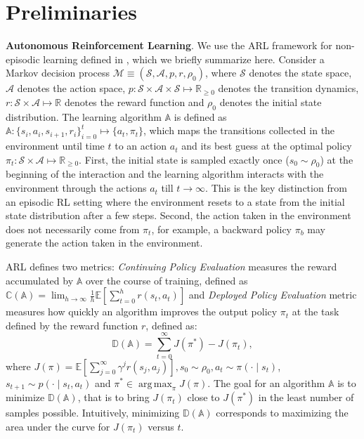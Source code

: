 \documentclass[nohyperref]{article}
\theoremstyle{plain}
\theoremstyle{definition}
\theoremstyle{remark}
\DeclareMathOperator*{\argmax}{arg\,max}
\begin{document}
\section{Preliminaries}
\label{sec:prelims}
\textbf{Autonomous Reinforcement Learning}. We use the ARL framework for non-episodic learning defined in \citet{sharma2021autonomous}, which we briefly summarize here.
Consider a Markov decision process ${\mathcal{M} \equiv (\mathcal{S}, \mathcal{A}, p, r, \rho_0)}$, where $\mathcal{S}$ denotes the state space, $\mathcal{A}$ denotes the action space, ${p : \mathcal{S} \times \mathcal{A} \times \mathcal{S} \mapsto \mathbb{R}_{\geq 0}}$ denotes the transition dynamics, ${r: \mathcal{S} \times \mathcal{A} \mapsto \mathbb{R}}$ denotes the reward function and $\rho_0$ denotes the initial state distribution. The learning algorithm $\mathbb{A}$ is defined as ${\mathbb{A}: \{s_i, a_i, s_{i+1}, r_i\}_{i=0}^t \mapsto \{a_t, \pi_t\}}$, which maps the transitions collected in the environment until time $t$ to an action $a_t$ and its best guess at the optimal policy ${\pi_t: \mathcal{S} \times \mathcal{A} \mapsto \mathbb{R}_{\geq 0}}$. First, the initial state is sampled exactly once ($s_0 \sim \rho_0$) at the beginning of the interaction and the learning algorithm interacts with the environment through the actions $a_t$ till $t \to \infty$. This is the key distinction from an episodic RL setting where the environment resets to a state from the initial state distribution after a few steps. Second, the action taken in the environment does not necessarily come from $\pi_t$, for example, a backward policy $\pi_b$ may generate the action taken in the environment.

ARL defines two metrics: \textit{Continuing Policy Evaluation} measures the reward accumulated by $\mathbb{A}$ over the course of training, defined as ${\mathbb{C}(\mathbb{A}) = \lim_{h \to\infty}\frac{1}{h} \mathbb{E}\left[\sum_{t=0}^h r(s_t, a_t) \right]}$ and
 \textit{Deployed Policy Evaluation} metric measures how quickly an algorithm improves the output policy $\pi_t$ at the task defined by the reward function $r$, defined as:
\begin{equation}
    \mathbb{D}(\mathbb{A}) = \sum_{t=0}^\infty J(\pi^*) - J(\pi_t),
\end{equation}
where ${J(\pi) = \mathbb{E}\left[\sum_{j=0}^\infty \gamma^j r(s_j, a_j) \right], s_0 \sim \rho_0, a_t \sim \pi(\cdot \mid s_t)}$, ${s_{t+1}\sim p(\cdot \mid s_t, a_t)}$ and ${\pi^* \in \argmax_\pi J(\pi)}$. The goal for an algorithm $\mathbb{A}$ is to minimize $\mathbb{D}(\mathbb{A})$, that is to bring $J(\pi_t)$ close to $J(\pi^*)$ in the least number of samples possible. Intuitively, minimizing $\mathbb{D}(\mathbb{A})$ corresponds to maximizing the area under the curve for $J(\pi_t)$ versus $t$.
\end{document}
